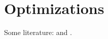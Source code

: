 \section{Optimizations}

Some literature: \cite{haeberlen:studythesis} and \cite{haeberlen:wiess00}.

